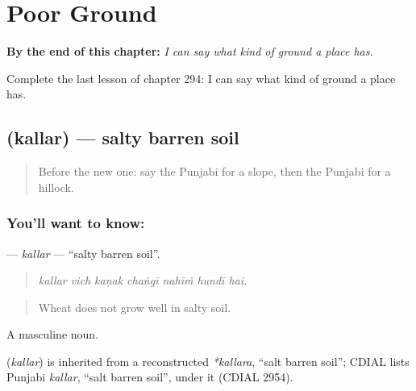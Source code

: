 
\chapter{Poor Ground}
\label{ch:pa-a2-poor-ground}

\begin{chapteropening}
\textbf{By the end of this chapter:} \emph{I can say what kind of ground a place has.}

Complete the last lesson of chapter 294: I can say what kind of ground a place has.
\end{chapteropening}

\section[\texorpdfstring{\pa{ਕੱਲਰ} (kallar)}{ਕੱਲਰ (kallar)}]{ (kallar) — salty barren soil}

\label{lesson:PA-C294-kallar}



\begin{quote}
Before the new one: say the Punjabi for a slope, then the Punjabi for a hillock.
\end{quote}

\subsection*{You'll want to know: }
\textbf{} — \emph{kallar} — \textquotedblleft{}salty barren soil\textquotedblright{}.

\begin{quote}
      
\end{quote}

\begin{quote}
\emph{kallar vich kaṇak chaṅgī nahīṁ hundī hai.}
\end{quote}

\begin{quote}
Wheat does not grow well in salty soil.
\end{quote}

A masculine noun.

\begin{cousinweb}
\textbf{} (\emph{kallar}) is inherited from a reconstructed \emph{*kallara}, \textquotedblleft{}salt barren soil\textquotedblright{}; CDIAL lists Punjabi \emph{kallar}, \textquotedblleft{}salt barren soil\textquotedblright{}, under it (CDIAL 2954).
\end{cousinweb}


